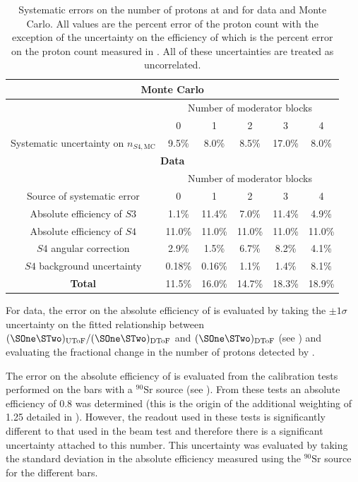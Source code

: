 \begin{table}
  \caption[Systematic errors on the number of protons at \SThree and \SFour for data and Monte Carlo]{Systematic errors on the number of protons at \SThree and \SFour for data and Monte Carlo. All values are the percent error of the \SFour proton count with the exception of the uncertainty on the efficiency of \SThree which is the percent error on the proton count measured in \SThree. All of these uncertainties are treated as uncorrelated.}
  \label{tab:systs}
  \begin{tabular}{c c c c c c}
    \hline
    \hline
    \multicolumn{6}{c}{\textbf{Monte Carlo}} \\
    \hline
    & \multicolumn{5}{c}{Number of moderator blocks} \\
    & 0 & 1 & 2 & 3 & 4 \\
    \hline
    Systematic uncertainty on $n_{\mathit{S4},\text{MC}}$ & 9.5\% & 8.0\% & 8.5\% & 17.0\% & 8.0\% \\
    \hline
    \multicolumn{6}{c}{\textbf{Data}} \\
    \hline
    & \multicolumn{5}{c}{Number of moderator blocks} \\
    Source of systematic error & 0 & 1 & 2 & 3 & 4 \\
    \hline
    Absolute efficiency of $\mathit{S3}$ & 1.1\% & 11.4\% & 7.0\% & 11.4\% & 4.9\% \\
    Absolute efficiency of $\mathit{S4}$ & 11.0\% & 11.0\% & 11.0\% & 11.0\% & 11.0\% \\ 
    $\mathit{S4}$ angular correction & 2.9\% & 1.5\% & 6.7\% & 8.2\% & 4.1\% \\
    $\mathit{S4}$ background uncertainty & 0.18\% & 0.16\% & 1.1\% & 1.4\% & 8.1\% \\
    \hline
    \textbf{Total} & 11.5\% & 16.0\% & 14.7\% & 18.3\% & 18.9\% \\
    \hline
  \end{tabular}
\end{table}

For data, the error on the absolute efficiency of \SThree is evaluated by taking the $\pm 1 \sigma$ uncertainty on the fitted relationship between $(\SOne\STwo)_{\text{UToF}}/(\SOne\STwo)_{\text{DToF}}$ and $(\SOne\STwo)_{\text{DToF}}$ (see ) and evaluating the fractional change in the number of protons detected by \SThree.

The error on the absolute efficiency of \SFour is evaluated from the calibration tests performed on the bars with a $^{90}\text{Sr}$ source (see ).
From these tests an absolute efficiency of 0.8 was determined (this is the origin of the additional weighting of 1.25 detailed in ).
However, the readout used in these tests is significantly different to that used in the beam test and therefore there is a significant uncertainty attached to this number.
This uncertainty was evaluated by taking the standard deviation in the absolute efficiency measured using the $^{90}\text{Sr}$ source for the different bars.

